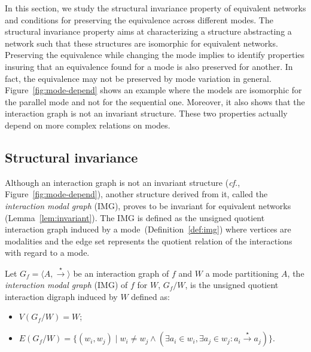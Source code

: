 \documentclass[12pt]{elsarticle}
\newcommand{\tuple}[1]{\langle #1 \rangle}
\newcommand{\abbrev}[1]{#1, \relax}
\newcommand{\cf}[0]{\abbrev{\textit{cf.}}}
\begin{document}
In this section, we study the structural invariance property of equivalent networks and conditions for preserving the equivalence across different modes. The structural invariance property aims at characterizing a structure abstracting a network such that these structures are isomorphic for equivalent networks. Preserving the equivalence while changing the mode implies to identify properties insuring that an equivalence found for a mode is also preserved for another.
 In fact, the equivalence may not be preserved by mode variation in general. Figure~\ref{fig:mode-depend} shows an example where the models are isomorphic for the parallel mode and not for the sequential one. Moreover, it also shows that the interaction graph is not an invariant structure. These two properties actually depend on more complex relations on modes. 

\subsection{Structural invariance} Although an interaction graph is not an invariant structure (\cf Figure~\ref{fig:mode-depend}), another structure derived from it, called the \emph{interaction modal graph} (IMG), proves to be invariant for equivalent networks (Lemma~\ref{lem:invariant}). The IMG is defined as the unsigned quotient interaction graph induced by a mode~(Definition~\ref{def:img}) where vertices are modalities and the edge set represents the quotient relation of the interactions with regard to a mode. 

\begin{definition}
\label{def:img}
Let $G_f=\tuple{A, \stackrel{\star}{\longrightarrow}}$ be an interaction graph of $f$ and $W$ a mode partitioning $A$, the \emph{interaction modal graph} (IMG) of $f$ for $W$, $G_f/W$, is the unsigned quotient interaction digraph induced by $W$ defined as:
\begin{itemize}
\item $V(G_f/W)=W$;
\item $E(G_f/W)=\{(w_i,w_j)\mid w_i \neq w_j \wedge (\exists a_i \in w_i, \exists a_j \in w_j: a_i \stackrel{\star}{\longrightarrow} a_j )\}.$
\end{itemize}
\end{definition}
\end{document}
